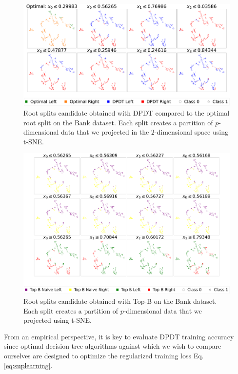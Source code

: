 \begin{figure}
    \centering
    \includegraphics[width=1\linewidth]{images/figures/splits_tsne_combined.pdf}
    \caption{Root splits candidate obtained with DPDT compared to the optimal root split on the Bank dataset. Each split creates a partition of $p$-dimensional data that we projected in the $2$-dimensional space using t-SNE.}
    \label{fig:splits_dpdt}
\end{figure}
\begin{figure}
    \centering
    \includegraphics[width=1\linewidth]{images/figures/splits_tsne_combined_topk.pdf}
    \caption{Root splits candidate obtained with Top-B\cite{topk} on the Bank dataset. Each split creates a partition of $p$-dimensional data that we projected using t-SNE.}
    \label{fig:splits_topb}
\end{figure}

From an empirical perspective, it is key to evaluate DPDT training accuracy since optimal decision tree algorithms against which we wish to compare ourselves are designed to optimize the regularized training loss Eq.\ref{eq:suplearning}.

